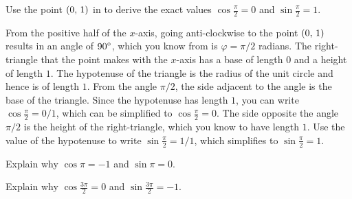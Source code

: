 \documentclass[a4paper,oneside,12pt]{article}
\begin{document}
\begin{example}
Use the point $\left\lparen{0},\, {1}\right\rparen$ in  to
derive the exact values $\cos\frac{\pi}{2} = 0$ and
$\sin\frac{\pi}{2} = 1$.
\end{example}

\begin{solution}
From the positive half of the $x$-axis, going anti-clockwise to the
point $\left\lparen{0},\, {1}\right\rparen$ results in an angle of ${90}^{\circ}$, which you
know from  is
$\varphi = \pi / 2$ radians.  The right-triangle that the point makes
with the $x$-axis has a base of length $0$ and a height of length
$1$.  The hypotenuse of the triangle is the radius of the unit circle
and hence is of length $1$.  From the angle $\pi / 2$, the side
adjacent to the angle is the base of the triangle.  Since the
hypotenuse has length $1$, you can write
$\cos\frac{\pi}{2} = 0 / 1$, which can be simplified to
$\cos\frac{\pi}{2} = 0$.  The side opposite the angle $\pi / 2$ is the
height of the right-triangle, which you know to have length $1$.  Use
the value of the hypotenuse to write $\sin\frac{\pi}{2} = 1 / 1$,
which simplifies to $\sin\frac{\pi}{2} = 1$.
\end{solution}

\begin{exercise}
Explain why $\cos\pi = -1$ and $\sin\pi = 0$.
\end{exercise}


\begin{exercise}
\label{ex:cos_sin_270_degrees}
Explain why $\cos\frac{3\pi}{2} = 0$ and $\sin\frac{3\pi}{2} = -1$.
\end{exercise}

\end{document}
